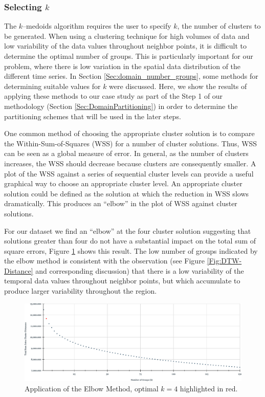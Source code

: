 \subsubsection{Selecting $k$}
\label{Sec:Selectk}

The $k$--medoids algorithm requires the user to specify $k$, the number of clusters to be generated. When using a clustering technique for high volumes of data and low variability of the data values throughout neighbor points, it is difficult to determine the optimal number of groups. This is particularly important for our problem, where there is low variation in the spatial data distribution of the different time series. In Section \ref{Sec:domain_number_groups}, some methods for determining suitable values for $k$ were discussed. Here, we show the results of applying these methods to our case study as part of the Step 1 of our methodology (Section \ref{Sec:DomainPartitioning}) in order to determine the partitioning schemes that will be used in the later steps.

One common method of choosing the appropriate cluster solution is to compare the Within-Sum-of-Squares (WSS) for a number of cluster solutions. Thus, WSS can be seen as a global measure of error. In general, as the number of clusters increases, the WSS should decrease because clusters are consequently smaller. A plot of the WSS against a series of sequential cluster levels can provide a useful graphical way to choose an appropriate cluster level. An appropriate cluster solution could be defined as the solution at which the reduction in WSS slows dramatically. This produces an ``elbow'' in the plot of WSS against cluster solutions. 

For our dataset we find an ``elbow'' at the four cluster solution suggesting that solutions greater than four do not have a substantial impact on the total sum of square errors, Figure \ref{Fig:SSE-kMedoids} shows this result. The low number of groups indicated by the elbow method is consistent with the observation (see Figure \ref{Fig:DTW-Distance} and corresponding discussion) that there is a low variability of the temporal data values throughout neighbor points, but which accumulate to produce larger variability throughout the region.

\begin{figure}[h]
	\centering
	\includegraphics[scale=0.5]{../Figures/Elbow-Kmedoids}
	\caption{Application of the Elbow Method, optimal $k=4$ highlighted in red.}
	\label{Fig:SSE-kMedoids}
\end{figure}

